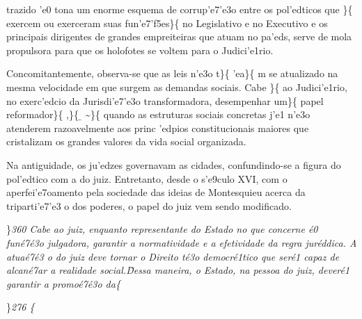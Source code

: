 trazido 'e0 tona um enorme esquema de corrup'e7'e3o entre os pol'edticos
que \}\{\rtlch{}  \ltrch{}  exercem ou
exerceram suas fun'e7'f5es\}\{\rtlch{}  \ltrch{}
 no Legislativo e no Executivo e os
principais dirigentes de grandes empreiteiras que atuam no pa'eds, serve
de mola propulsora para que os holofotes se voltem para o Judici'e1rio.
\par Concomitantemente, observa-se que as leis n'e3o t\}\{\rtlch{}
 \ltrch{}  'ea\}\{\rtlch{}  \ltrch{}
 m se atualizado na mesma velocidade em
que surgem as demandas sociais. Cabe \}\{\rtlch{}  \ltrch{}
 ao
Judici'e1rio, no exerc'edcio da Jurisdi'e7'e3o transformadora,
desempenhar um\}\{\rtlch{}  \ltrch{}
papel reformador\}\{\rtlch{}  \ltrch{}
,\}\{\rtlch{} \ab{} \ltrch{}
\b{}
\textasciitilde{}\}\{\rtlch{}  \ltrch{}
 quando
as estruturas sociais concretas j'e1 n'e3o atenderem razoavelmente aos
princ 'edpios constitucionais maiores que cristalizam os grandes valores
da vida social organizada. \par Na antiguidade, os ju'edzes governavam
as cidades, confundindo-se a figura do pol'edtico com a do juiz.
Entretanto, desde o s'e9culo XVI, com o aperfei'e7oamento pela sociedade
das ideias de Montesquieu acerca da triparti'e7'e3 o dos poderes, o
papel do juiz vem sendo modificado.
\par \}\pard \ltrpar\qj {}\sl360\widctlpar\wrapdefault\aspalpha\aspnum\faauto\adjustright{} {\rtlch{}  \ltrch{}  
Cabe ao juiz, enquanto representante do Estado no que concerne \'e0 fun\'e7\'e3o julgadora, }{\rtlch{}  \ltrch{}  garantir a normatividade e a efetividade da regra jur\'eddica. A atua\'e7\'e3
o do juiz deve tornar o Direito t\'e3o democr\'e1tico que ser\'e1 capaz de alcan\'e7ar a realidade social.\~ Dessa maneira, o Estado, na pessoa do juiz, dever\'e1 garantir a promo\'e7\'e3o da}\{\rtlch{}
 \ltrch{} 
\par \}\pard \ltrpar\ql {}\sl276\widctlpar\wrapdefault\aspalpha\aspnum\faauto\adjustright{} \{\rtlch{}
